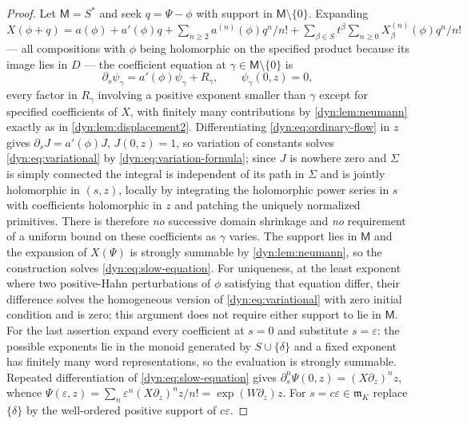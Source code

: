 \documentclass[11pt,letterpaper]{article}
\theoremstyle{definition}
\theoremstyle{remark}
\newcommand{\m}{\mathfrak m}
\newcommand{\eps}{\varepsilon}
\numberwithin{equation}{section}
\begin{document}
\begin{proof}
Let $\mathsf M=S^{*}$ and seek $q=\Psi-\phi$ with support in
$\mathsf M\setminus\{0\}$. Expanding
$X(\phi+q)=a(\phi)+a'(\phi)q+\sum_{n\ge2}a^{(n)}(\phi)q^{n}/n!
+\sum_{\beta\in S}t^{\beta}\sum_{n\ge0}X_\beta^{(n)}(\phi)q^{n}/n!$ --- all
compositions with $\phi$ being holomorphic on the specified product because
its image lies in $D$ --- the coefficient equation at
$\gamma\in\mathsf M\setminus\{0\}$ is
\begin{equation}\label{dyn:eq:variational}
 \partial_s\psi_\gamma=a'(\phi)\psi_\gamma+R_\gamma,
 \qquad \psi_\gamma(0,z)=0,
\end{equation}
every factor in $R_\gamma$ involving a positive exponent smaller than
$\gamma$ except for specified coefficients of $X$, with finitely many
contributions by \cref{dyn:lem:neumann} exactly as in
\cref{dyn:lem:displacement2}. Differentiating
\eqref{dyn:eq:ordinary-flow} in $z$ gives
$\partial_sJ=a'(\phi)J$, $J(0,z)=1$, so variation of constants solves
\eqref{dyn:eq:variational} by \eqref{dyn:eq:variation-formula}; since $J$
is nowhere zero and $\Sigma$ is simply connected the integral is
independent of its path in $\Sigma$ and is jointly holomorphic in $(s,z)$,
locally by integrating the holomorphic power series in $s$ with
coefficients holomorphic in $z$ and patching the uniquely normalized
primitives. There is therefore \emph{no} successive domain shrinkage and
\emph{no} requirement of a uniform bound on these coefficients as $\gamma$
varies. The support lies in $\mathsf M$ and the expansion of $X(\Psi)$ is
strongly summable by \cref{dyn:lem:neumann}, so the construction solves
\eqref{dyn:eq:slow-equation}. For uniqueness, at the least exponent where
two positive-Hahn perturbations of $\phi$ satisfying that equation differ,
their difference solves the homogeneous version of
\eqref{dyn:eq:variational} with zero initial condition and is zero; this
argument does not require either support to lie in $\mathsf M$. For the
last assertion expand every coefficient at $s=0$ and substitute
$s=\eps$: the possible exponents lie in the monoid generated by
$S\cup\{\delta\}$ and a fixed exponent has finitely many word
representations, so the evaluation is strongly summable. Repeated
differentiation of \eqref{dyn:eq:slow-equation} gives
$\partial_s^{n}\Psi(0,z)=(X\partial_z)^{n}z$, whence
$\Psi(\eps,z)=\sum_n\eps^{n}(X\partial_z)^{n}z/n!=\exp(W\partial_z)z$. For
$s=c\eps\in\m_K$ replace $\{\delta\}$ by the well-ordered positive support
of $c\eps$.
\end{proof}
\end{document}
